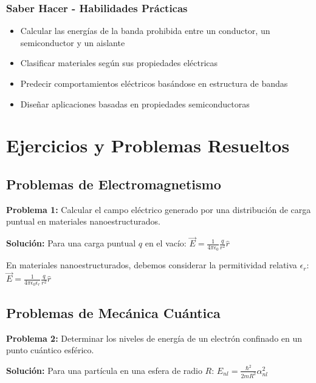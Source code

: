 \documentclass[12pt,a4paper,twoside]{book}
\begin{document}
	\subsection{Saber Hacer - Habilidades Prácticas}
	\begin{hacerbox}
		\begin{itemize}
			\item Calcular las energías de la banda prohibida entre un conductor, un semiconductor y un aislante
			\item Clasificar materiales según sus propiedades eléctricas
			\item Predecir comportamientos eléctricos basándose en estructura de bandas
			\item Diseñar aplicaciones basadas en propiedades semiconductoras
		\end{itemize}
	\end{hacerbox}
	
	\chapter{Ejercicios y Problemas Resueltos}
	\label{chap:ejercicios}
	
	\section{Problemas de Electromagnetismo}
	\label{sec:problemas_electromagnetismo}
	
	\textbf{Problema 1:} Calcular el campo eléctrico generado por una distribución de carga puntual en materiales nanoestructurados.
	
	\textbf{Solución:}
	Para una carga puntual $q$ en el vacío:
	$\vec{E} = \frac{1}{4\pi\epsilon_0} \frac{q}{r^2} \hat{r}$
	
	En materiales nanoestructurados, debemos considerar la permitividad relativa $\epsilon_r$:
	$\vec{E} = \frac{1}{4\pi\epsilon_0\epsilon_r} \frac{q}{r^2} \hat{r}$
	
	\section{Problemas de Mecánica Cuántica}
	\label{sec:problemas_cuantica}
	
	\textbf{Problema 2:} Determinar los niveles de energía de un electrón confinado en un punto cuántico esférico.
	
	\textbf{Solución:}
	Para una partícula en una esfera de radio $R$:
	$E_{nl} = \frac{\hbar^2}{2mR^2} \alpha_{nl}^2$
	
\end{document}
